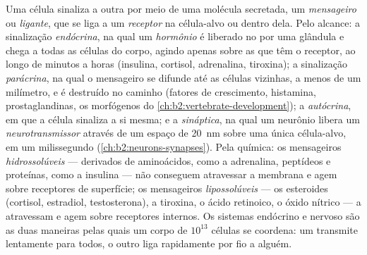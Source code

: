 \begin{definition}\label{def:b2:cell-signalling:kinds}
Uma célula sinaliza a outra por meio de uma molécula secretada, um
\emph{mensageiro} ou \emph{ligante}, que se liga a um \emph{receptor}
na célula-alvo ou dentro dela. Pelo alcance: a sinalização
\emph{endócrina}, na qual um \emph{hormônio} é liberado no  por
uma glândula e chega a todas as células do corpo, agindo apenas sobre
as que têm o receptor, ao longo de minutos a horas (insulina, cortisol,
adrenalina, tiroxina); a sinalização \emph{parácrina}, na qual o
mensageiro se difunde até as células vizinhas, a menos de um milímetro,
e é destruído no caminho (fatores de crescimento, histamina,
prostaglandinas, os morfógenos do \cref{ch:b2:vertebrate-development}); a \emph{autócrina}, em que
a célula sinaliza a si mesma; e a \emph{sináptica}, na qual um neurônio
libera um \emph{neurotransmissor} através de um espaço de
\qty{20}{nm} sobre uma única célula-alvo, em um milissegundo
(\cref{ch:b2:neurons-synapses}). Pela química: os mensageiros \emph{hidrossolúveis} ---
derivados de aminoácidos, como a adrenalina, peptídeos e proteínas,
como a insulina --- não conseguem atravessar a membrana e agem sobre
receptores de superfície; os mensageiros \emph{lipossolúveis} --- os
esteroides (cortisol, estradiol, testosterona), a tiroxina, o ácido
retinoico, o óxido nítrico --- a atravessam e agem sobre receptores
internos. Os sistemas endócrino e nervoso são as duas maneiras pelas
quais um corpo de $10^{13}$ células se coordena: um transmite
lentamente para todos, o outro liga rapidamente por fio a alguém.
\end{definition}

